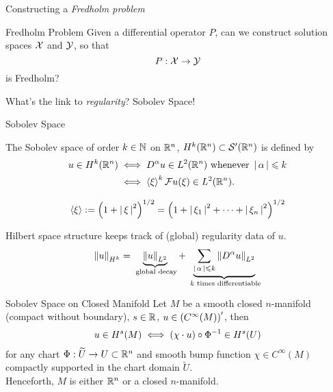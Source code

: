 \documentclass{beamer}
\begin{document}
\begin{frame}{Constructing a \textit{Fredholm problem}} 
\begin{block}{Fredholm Problem}
    Given a differential operator $P$, can we construct solution spaces $\X$ and $ \Y$,  so that $$P : \X \to \Y$$ is Fredholm? 
\end{block}
\pause 

What's the link to \textit{regularity}? 
\pause 
Sobolev Space! 

\end{frame} 

\begin{frame}{Sobolev Space}
\begin{definition}
    The Sobolev space of order $k \in \N$ on $\R^n$,  $H^k(\R^n) \subset \sch'(\R^n)$  is defined by 
    \begin{align*}
    u \in H^k(\R^n) 
    &\iff D^\alpha u \in L^2(\R^n) \text{ whenever } \abs{\alpha} \leq k\\
    &\iff \sym[\xi]^k \F u (\xi) \in L^2(\R^n). 
    \end{align*}
\end{definition}

\begin{align*}
\sym[\xi] &:= \brac{1 + \abs{\xi}^2}^{1/2} = \brac{1 + \abs{\xi_1}^2+ \dots + \abs{\xi_n}^2}^{1/2} \\
\end{align*}

Hilbert space structure keeps track of (global) regularity data of $u$. 
\begin{align*}
    \norm[u]_{H^k} = \underbrace{\norm[u]_{L^2}}_{\text{ global decay}}  + \underbrace{\sum_{\abs{\alpha} \leq k} \norm[D^\alpha u ]_{L^2} }_{\text{ $k$ times differentiable}} 
\end{align*}

\end{frame} 


\begin{frame}{Sobolev Space on Closed Manifold}
Let $M$ be a smooth closed $n$-manifold (compact without boundary), $s \in \R$, $u \in \brac{C^\infty(M)}'$, then 
\begin{align*}
u \in H^s(M) \iff \brac{\chi \cdot  u} \circ \Phi^{-1} \in H^s(U)
\end{align*} 
for any chart $\Phi : \widetilde{U} \to U \subset \R^n$ and smooth bump function $\chi \in C^\infty(M)$ compactly supported in the chart domain $\widetilde{U}$. \\[3em]
\pause 
Henceforth, $M$ is either $\R^n$ or a closed $n$-manifold. 
\end{frame} 
\end{document}
